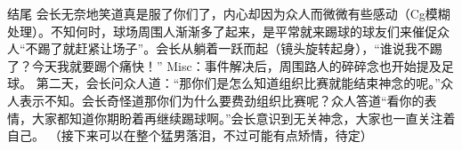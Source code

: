 结尾
	会长无奈地笑道真是服了你们了，内心却因为众人而微微有些感动（Cg模糊处理）。不知何时，球场周围人渐渐多了起来，是平常就来踢球的球友们来催促众人“不踢了就赶紧让场子”。会长从躺着一跃而起（镜头旋转起身），“谁说我不踢了？今天我就要踢个痛快！”
Misc：事件解决后，周围路人的碎碎念也开始提及足球。
第二天，会长问众人道：“那你们是怎么知道组织比赛就能结束神念的呢。”众人表示不知。会长奇怪道那你们为什么要费劲组织比赛呢？众人答道“看你的表情，大家都知道你期盼着再继续踢球啊。”会长意识到无关神念，大家也一直关注着自己。
（接下来可以在整个猛男落泪，不过可能有点矫情，待定）
